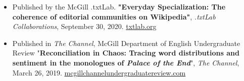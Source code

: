 \begin{itemize}
    \item Published by the McGill .txtLab. \textbf{"Everyday Specialization: The coherence of editorial communities on Wikipedia"}, \textit{.txtLab Collaborations}, September 30, 2020.  \href{https://txtlab.org/2020/09/do-wikipedia-editors-specialize/}{txtlab.org}
\end{itemize}
\begin{itemize}
\item  Published in \textit{The Channel}, McGill Department of English Undergraduate Review "\textbf{Reconciliation in Chaos: Tracing word distributions and sentiment in the monologues of \textit{Palace of the End}}", \textit{The Channel}, March 26, 2019. \href{http://mcgillchannelundergraduatereview.com/2019/03/reconciliation-in-chaos-tracing-word-distributions-and-sentiment-in-the-monologues-of-palace-of-the-end/}{mcgillchannelundergraduatereview.com}
\end{itemize}
